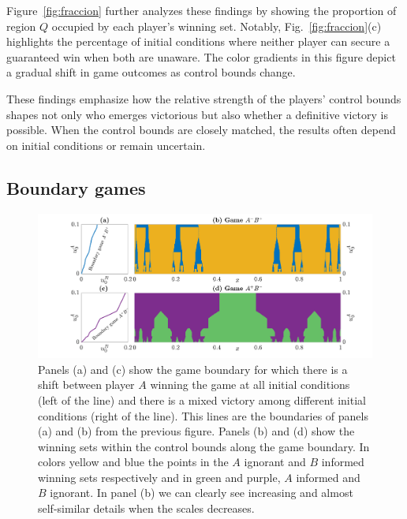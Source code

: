 Figure~\ref{fig:fraccion} further analyzes these findings by showing the proportion of region $Q$ occupied by each player's winning set. Notably, Fig.~\ref{fig:fraccion}(c) highlights the percentage of initial conditions where neither player can secure a guaranteed win when both are unaware. The color gradients in this figure depict a gradual shift in game outcomes as control bounds change.

These findings emphasize how the relative strength of the players' control bounds shapes not only who emerges victorious but also whether a definitive victory is possible. When the control bounds are closely matched, the results often depend on initial conditions or remain uncertain.


\subsection{Boundary games}

\begin{figure}
    \centering
    \includegraphics[trim={3.3cm 0cm 0cm 0cm}, clip,width=1.06\textwidth ]{Images/P5/bifurcation.png}
    \caption{Panels (a) and (c) show the game boundary for which there is a shift between player $A$ winning the game at all initial conditions (left of the line) and there is a mixed victory among different initial conditions (right of the line). This lines are the boundaries of panels (a) and (b) from the previous figure. Panels (b) and (d) show the winning sets within the control bounds along the game boundary. In colors yellow and blue the points in the $A$ ignorant and $B$ informed winning sets respectively and in green and purple, $A$ informed and $B$ ignorant. In panel (b) we can clearly see increasing and almost self-similar details when the scales decreases.}
    \label{fig:bifurcation}
\end{figure}







